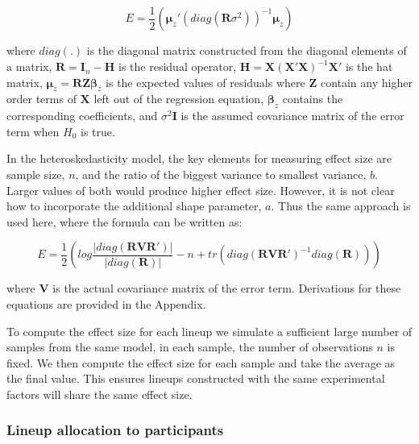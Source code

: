 \documentclass[]{interact}
\theoremstyle{plain}%
\theoremstyle{definition}
\theoremstyle{remark}
\begin{document}
\begin{equation}
E = \frac{1}{2}\left(\boldsymbol{\mu}_z'(diag(\boldsymbol{R}\sigma^2))^{-1}\boldsymbol{\mu}_z\right)
\label{eq:nonlin-effect-size}
\end{equation}

\noindent where \(diag(.)\) is the diagonal matrix constructed from the
diagonal elements of a matrix,
\(\boldsymbol{R} = \boldsymbol{I}_n - \boldsymbol{H}\) is the residual
operator,
\(\boldsymbol{H} = \boldsymbol{X}(\boldsymbol{X}'\boldsymbol{X})^{-1}\boldsymbol{X}'\)
is the hat matrix,
\(\boldsymbol{\mu}_z = \boldsymbol{R}\boldsymbol{Z}\boldsymbol{\beta}_z\)
is the expected values of residuals where \(\boldsymbol{Z}\) contain any
higher order terms of \(\boldsymbol{X}\) left out of the regression
equation, \(\boldsymbol{\beta}_z\) contains the corresponding
coefficients, and \(\sigma^2\boldsymbol{I}\) is the assumed covariance
matrix of the error term when \(H_0\) is true.

In the heteroskedasticity model, the key elements for measuring effect
size are sample size, \(n\), and the ratio of the biggest variance to
smallest variance, \(b\). Larger values of both would produce higher
effect size. However, it is not clear how to incorporate the additional
shape parameter, \(a\). Thus the same approach is used here, where the
formula can be written as:

\begin{equation}
E = \frac{1}{2}\left(log\frac{|diag(\boldsymbol{R}\boldsymbol{V}\boldsymbol{R}')|}{|diag(\boldsymbol{R})|} - n + tr(diag(\boldsymbol{R}\boldsymbol{V}\boldsymbol{R}')^{-1}diag(\boldsymbol{R}))\right)
\label{eq:hetero-effect-size}
\end{equation}

\noindent where \(\boldsymbol{V}\) is the actual covariance matrix of
the error term. Derivations for these equations are provided in the
Appendix.

To compute the effect size for each lineup we simulate a sufficient
large number of samples from the same model, in each sample, the number
of observations \(n\) is fixed. We then compute the effect size for each
sample and take the average as the final value. This ensures lineups
constructed with the same experimental factors will share the same
effect size.

\hypertarget{lineup-allocation-to-participants}{%
\subsubsection{Lineup allocation to
participants}\label{lineup-allocation-to-participants}}
\end{document}
